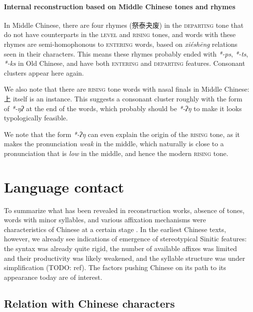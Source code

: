 \documentclass[UTF8, a4paper, oneside, scheme=plain, 12pt]{ctexrep}
\newcommand*{\citepage}[1]{p.~{#1}}
\newcommand{\form}[1]{\emph{#1}}
\newcommand*{\category}[1]{\textsc{#1}}
\begin{document}
\subsubsection{Internal reconstruction based on Middle Chinese tones and rhymes}

In Middle Chinese, there are four rhymes (祭泰夬废) in the \category{departing} tone
that do not have counterparts in the \category{level} and \category{rising} tones,
and words with these rhymes are semi-homophonous to \category{entering} words,
based on \form{xiéshēng} relations seen in their characters.
This means these rhymes probably ended with \form{*-ps}, \form{*-ts}, \form{*-ks} in Old Chinese,
and have both \category{entering} and \category{departing} features.
Consonant clusters appear here again.

We also note that there are \category{rising} tone words with nasal finals in Middle Chinese:
上 itself is an instance.
This suggests a  consonant cluster roughly with the form of \form{*-ŋʔ} at the end of the words,
which probably should be \form{*-ʔŋ} to make it looks typologically feasible.

We note that the form \form{*-ʔŋ} can even explain the origin of the \category{rising} tone,
as it makes the pronunciation \emph{weak} in the middle,
which naturally is close to a pronunciation that is \emph{low} in the middle,
and hence the modern \category{rising} tone.







\chapter{Language contact}


To summarize what has been revealed in reconstruction works,
absence of tones, words with minor syllables,
and various affixation mechanisms were characteristics of Chinese 
at a certain stage \citep[\citepage{13}]{sagart1999roots}.
In the earliest Chinese texts, however, we already see indications of
emergence of stereotypical Sinitic features:
the syntax was already quite rigid,
the number of available affixes was limited and their productivity was likely weakened,
and the syllable structure was under simplification (TODO: ref).
The factors pushing Chinese on its path to its appearance today are of interest.

\section{Relation with Chinese characters}
\end{document}
